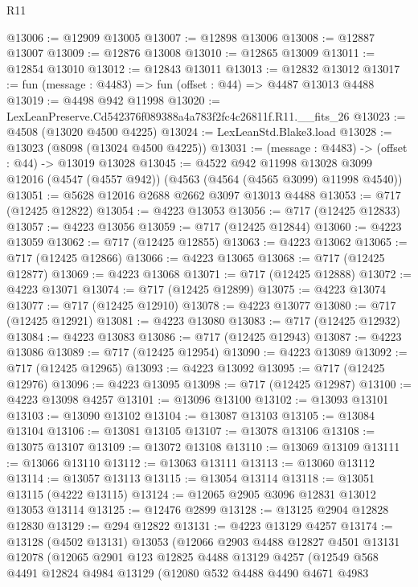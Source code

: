 \begin{lexlean}{R11}
\begin{coremodule}
@13006 := @12909 @13005
@13007 := @12898 @13006
@13008 := @12887 @13007
@13009 := @12876 @13008
@13010 := @12865 @13009
@13011 := @12854 @13010
@13012 := @12843 @13011
@13013 := @12832 @13012
@13017 := fun (message : @4483) => fun (offset : @44) => @4487 @13013 @4488
@13019 := @4498 @942 @11998
@13020 := LexLeanPreserve.Cd542376f089388a4a783f2fc4c26811f.R11.__fits_26
@13023 := @4508 (@13020 @4500 @4225)
@13024 := LexLeanStd.Blake3.load
@13028 := @13023 (@8098 (@13024 @4500 @4225))
@13031 := (message : @4483) -> (offset : @44) -> @13019 @13028
@13045 := @4522
    @942
    @11998
    @13028
    @3099
    @12016
    (@4547 (@4557 @942))
    (@4563 (@4564 (@4565 @3099) @11998 @4540))
@13051 := @5628 @12016 @2688 @2662 @3097 @13013 @4488
@13053 := @717 (@12425 @12822)
@13054 := @4223 @13053
@13056 := @717 (@12425 @12833)
@13057 := @4223 @13056
@13059 := @717 (@12425 @12844)
@13060 := @4223 @13059
@13062 := @717 (@12425 @12855)
@13063 := @4223 @13062
@13065 := @717 (@12425 @12866)
@13066 := @4223 @13065
@13068 := @717 (@12425 @12877)
@13069 := @4223 @13068
@13071 := @717 (@12425 @12888)
@13072 := @4223 @13071
@13074 := @717 (@12425 @12899)
@13075 := @4223 @13074
@13077 := @717 (@12425 @12910)
@13078 := @4223 @13077
@13080 := @717 (@12425 @12921)
@13081 := @4223 @13080
@13083 := @717 (@12425 @12932)
@13084 := @4223 @13083
@13086 := @717 (@12425 @12943)
@13087 := @4223 @13086
@13089 := @717 (@12425 @12954)
@13090 := @4223 @13089
@13092 := @717 (@12425 @12965)
@13093 := @4223 @13092
@13095 := @717 (@12425 @12976)
@13096 := @4223 @13095
@13098 := @717 (@12425 @12987)
@13100 := @4223 @13098 @4257
@13101 := @13096 @13100
@13102 := @13093 @13101
@13103 := @13090 @13102
@13104 := @13087 @13103
@13105 := @13084 @13104
@13106 := @13081 @13105
@13107 := @13078 @13106
@13108 := @13075 @13107
@13109 := @13072 @13108
@13110 := @13069 @13109
@13111 := @13066 @13110
@13112 := @13063 @13111
@13113 := @13060 @13112
@13114 := @13057 @13113
@13115 := @13054 @13114
@13118 := @13051 @13115 (@4222 @13115)
@13124 := @12065 @2905 @3096 @12831 @13012 @13053 @13114
@13125 := @12476 @2899
@13128 := @13125 @2904 @12828 @12830
@13129 := @294 @12822
@13131 := @4223 @13129 @4257
@13174 := @13128
    (@4502 @13131)
    @13053
    (@12066
      @2903
      @4488
      @12827
      @4501
      @13131
      @12078
      (@12065
        @2901
        @123
        @12825
        @4488
        @13129
        @4257
        (@12549
          @568
          @4491
          @12824
          @4984
          @13129
          (@12080
            @532
            @4488
            @4490
            @4671
            @4983

\end{coremodule}
\end{lexlean}
